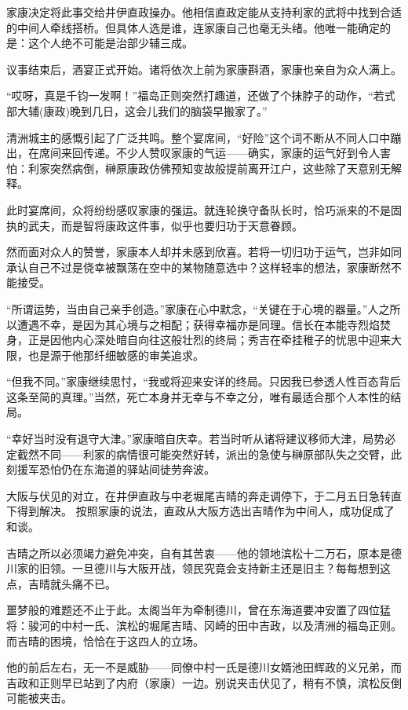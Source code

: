 \documentclass[
]{book}
\begin{document}
家康决定将此事交给井伊直政操办。他相信直政定能从支持利家的武将中找到合适的中间人牵线搭桥。但具体人选是谁，连家康自己也毫无头绪。他唯一能确定的是：这个人绝不可能是治部少辅三成。

议事结束后，酒宴正式开始。诸将依次上前为家康斟酒，家康也亲自为众人满上。

``哎呀，真是千钧一发啊！''福岛正则突然打趣道，还做了个抹脖子的动作，``若式部大辅(康政)晚到几日，这会儿我们的脑袋早搬家了。''

清洲城主的感慨引起了广泛共鸣。整个宴席间，``好险''这个词不断从不同人口中蹦出，在席间来回传递。不少人赞叹家康的气运------确实，家康的运气好到令人害怕：利家突然病倒，榊原康政仿佛预知变故般提前离开江户，这些除了天意别无解释。

此时宴席间，众将纷纷感叹家康的强运。就连轮换守备队长时，恰巧派来的不是固执的武夫，而是智将康政这件事，似乎也要归功于天意眷顾。

然而面对众人的赞誉，家康本人却并未感到欣喜。若将一切归功于运气，岂非如同承认自己不过是侥幸被飘荡在空中的某物随意选中？这样轻率的想法，家康断然不能接受。

``所谓运势，当由自己亲手创造。''家康在心中默念，``关键在于心境的器量。''人之所以遭遇不幸，是因为其心境与之相配；获得幸福亦是同理。信长在本能寺烈焰焚身，正是因他内心深处暗自向往这般壮烈的终局；秀吉在牵挂稚子的忧思中迎来大限，也是源于他那纤细敏感的审美追求。

``但我不同。''家康继续思忖，``我或将迎来安详的终局。只因我已参透人性百态背后这条至简的真理。''当然，死亡本身并无幸与不幸之分，唯有最适合那个人本性的结局。

``幸好当时没有退守大津。''家康暗自庆幸。若当时听从诸将建议移师大津，局势必定截然不同------利家的病情很可能突然好转，派出的急使与榊原部队失之交臂，此刻援军恐怕仍在东海道的驿站间徒劳奔波。

大阪与伏见的对立，在井伊直政与中老堀尾吉晴的奔走调停下，于二月五日急转直下得到解决。 按照家康的说法，直政从大阪方选出吉晴作为中间人，成功促成了和谈。

吉晴之所以必须竭力避免冲突，自有其苦衷------他的领地滨松十二万石，原本是德川家的旧领。一旦德川与大阪开战，领民究竟会支持新主还是旧主？每每想到这点，吉晴就头痛不已。

噩梦般的难题还不止于此。太阁当年为牵制德川，曾在东海道要冲安置了四位猛将：骏河的中村一氏、滨松的堀尾吉晴、冈崎的田中吉政，以及清洲的福岛正则。而吉晴的困境，恰恰在于这四人的立场。

他的前后左右，无一不是威胁------同僚中村一氏是德川女婿池田辉政的义兄弟，而吉政和正则早已站到了内府（家康）一边。别说夹击伏见了，稍有不慎，滨松反倒可能被夹击。
\end{document}
